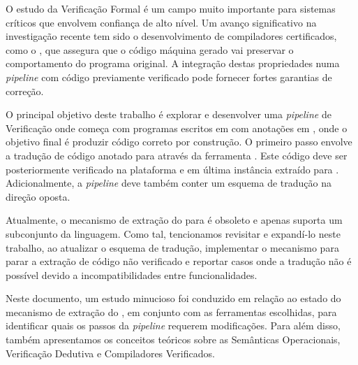 
%

O estudo da Verificação Formal é um campo muito importante para sistemas críticos que
envolvem confiança de alto nível. Um avanço significativo na investigação recente tem sido o
desenvolvimento de compiladores certificados, como o \cml, que assegura que o código máquina
gerado vai preservar o comportamento do programa original. A integração destas propriedades
numa \textit{pipeline} com código previamente verificado pode fornecer fortes garantias de correção.

O principal objetivo deste trabalho é explorar e desenvolver uma \textit{pipeline} de Verificação
onde começa com programas escritos em \ocaml com anotações em \gospel, onde o objetivo final
é produzir código \cml correto por construção. O primeiro passo envolve a tradução de código 
\ocaml anotado para \whyml através da ferramenta \cameleer. Este código \whyml deve ser 
posteriormente verificado na plataforma \whythree e em última instância extraído para \cml.
Adicionalmente, a \textit{pipeline} deve também conter um esquema de tradução na direção oposta.

Atualmente, o mecanismo de extração do \whythree para \cml é obsoleto e apenas suporta
um subconjunto da linguagem. Como tal, tencionamos revisitar e expandí-lo neste trabalho,
ao atualizar o esquema de tradução, implementar o mecanismo para parar a extração de
código não verificado e reportar casos onde a tradução não é possível devido a incompatibilidades
entre funcionalidades.

Neste documento, um estudo minucioso foi conduzido em relação ao estado do mecanismo de
extração do \whythree, em conjunto com as ferramentas escolhidas, para identificar quais 
os passos da \textit{pipeline} requerem modificações. Para além disso, também apresentamos
os conceitos teóricos sobre as Semânticas Operacionais, Verificação Dedutiva e Compiladores
Verificados.


